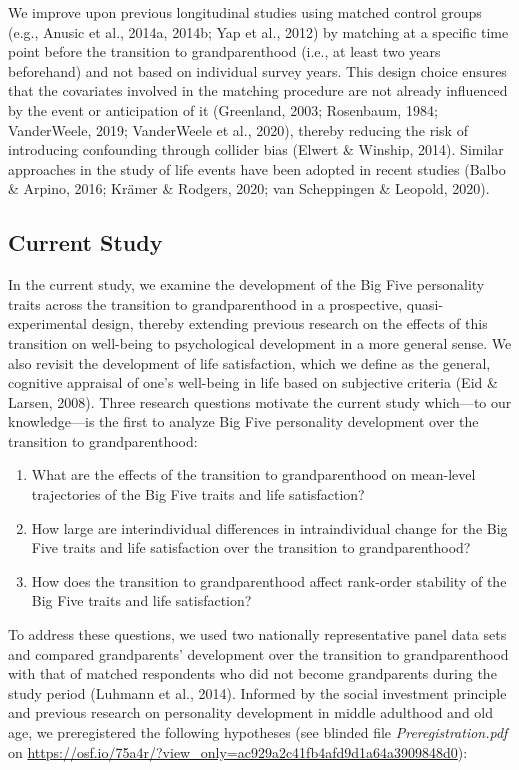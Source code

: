 \documentclass[
  english,
  man,floatsintext]{apa7}
\providecommand{\tightlist}{%
  \setlength{\itemsep}{0pt}\setlength{\parskip}{0pt}}
\begin{document}
We improve upon previous longitudinal studies using matched control groups (e.g., Anusic et al., 2014a, 2014b; Yap et al., 2012) by matching at a specific time point before the transition to grandparenthood (i.e., at least two years beforehand) and not based on individual survey years. This design choice ensures that the covariates involved in the matching procedure are not already influenced by the event or anticipation of it (Greenland, 2003; Rosenbaum, 1984; VanderWeele, 2019; VanderWeele et al., 2020), thereby reducing the risk of introducing confounding through collider bias (Elwert \& Winship, 2014). Similar approaches in the study of life events have been adopted in recent studies (Balbo \& Arpino, 2016; Krämer \& Rodgers, 2020; van Scheppingen \& Leopold, 2020).

\hypertarget{current-study}{%
\subsection{Current Study}\label{current-study}}

In the current study, we examine the development of the Big Five personality traits across the transition to grandparenthood in a prospective, quasi-experimental design, thereby extending previous research on the effects of this transition on well-being to psychological development in a more general sense. We also revisit the development of life satisfaction, which we define as the general, cognitive appraisal of one's well-being in life based on subjective criteria (Eid \& Larsen, 2008). Three research questions motivate the current study which---to our knowledge---is the first to analyze Big Five personality development over the transition to grandparenthood:

\begin{enumerate}
\def\labelenumi{\arabic{enumi}.}
\tightlist
\item
  What are the effects of the transition to grandparenthood on mean-level trajectories of the Big Five traits and life satisfaction?
\item
  How large are interindividual differences in intraindividual change for the Big Five traits and life satisfaction over the transition to grandparenthood?
\item
  How does the transition to grandparenthood affect rank-order stability of the Big Five traits and life satisfaction?
\end{enumerate}

To address these questions, we used two nationally representative panel data sets and compared grandparents' development over the transition to grandparenthood with that of matched respondents who did not become grandparents during the study period (Luhmann et al., 2014). Informed by the social investment principle and previous research on personality development in middle adulthood and old age, we preregistered the following hypotheses (see blinded file \emph{Preregistration.pdf} on \url{https://osf.io/75a4r/?view_only=ac929a2c41fb4afd9d1a64a3909848d0}):
\end{document}

